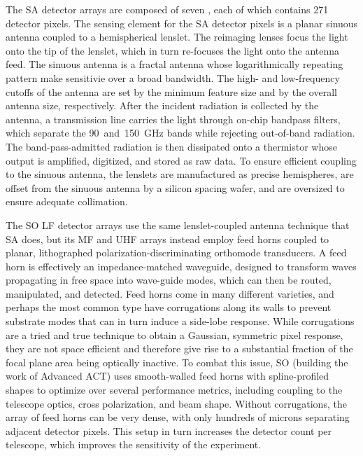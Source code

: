 The SA detector arrays are composed of seven , each of which contains 271 detector pixels. The sensing element for the SA detector pixels is a planar sinuous antenna coupled to a hemispherical lenslet. The reimaging lenses focus the light onto the tip of the lenslet, which in turn re-focuses the light onto the antenna feed. The sinuous antenna is a fractal antenna whose logarithmically repeating pattern make sensitivie over a broad bandwidth. The high- and low-frequency cutoffs of the antenna are set by the minimum feature size and by the overall antenna size, respectively. After the incident radiation is collected by the antenna, a transmission line carries the light through on-chip bandpass filters, which separate the 90~and~150~GHz bands while rejecting out-of-band radiation. The band-pass-admitted radiation is then dissipated onto a thermistor whose output is amplified, digitized, and stored as raw data. To ensure efficient coupling to the sinuous antenna, the lenslets are manufactured as precise hemispheres, are offset from the sinuous antenna by a silicon spacing wafer, and are oversized to ensure adequate collimation.

The SO LF detector arrays use the same lenslet-coupled antenna technique that SA does, but its MF and UHF arrays instead employ feed horns coupled to planar, lithographed polarization-discriminating orthomode transducers. A feed horn is effectively an impedance-matched waveguide, designed to transform waves propagating in free space into wave-guide modes, which can then be routed, manipulated, and detected. Feed horns come in many different varieties, and perhaps the most common type have corrugations along its walls to prevent substrate modes that can in turn induce a side-lobe response. While corrugations are a tried and true technique to obtain a Gaussian, symmetric pixel response, they are not space efficient and therefore give rise to a substantial fraction of the focal plane area being optically inactive. To combat this issue, SO (building the work of Advanced ACT) uses smooth-walled feed horns with spline-profiled shapes to optimize over several performance metrics, including coupling to the telescope optics, cross polarization, and beam shape. Without corrugations, the array of feed horns can be very dense, with only hundreds of microns separating adjacent detector pixels. This setup in turn increases the detector count per telescope, which improves the sensitivity of the experiment.


